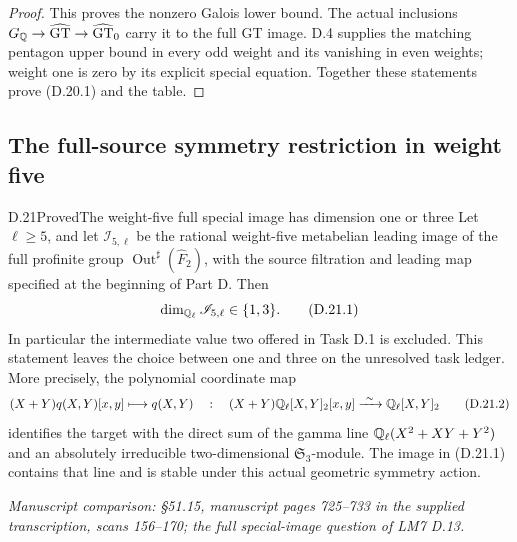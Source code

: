 \begin{proof}
This proves the nonzero Galois lower bound. The actual
inclusions $G_\mathbb Q\to\widehat{\rm GT}\to
\widehat{\rm GT}_0$ carry it to the full GT image.
D.4 supplies the matching pentagon upper bound in
every odd weight and its vanishing in even weights;
weight one is zero by its explicit special equation.
Together these statements prove (D.20.1) and the table.
\end{proof}
\subsection{The full-source symmetry restriction in weight five}

\begin{statement}{D.21}{Proved}{The weight-five full special image has dimension one or three}
Let $\ell\ge5$, and let $\mathscr I_{5,\ell}$ be the rational
weight-five metabelian leading image of the full profinite group
$\operatorname{Out}^{\sharp}(\widehat F_2)$, with the source
filtration and leading map specified at the beginning of Part D.
Then
\[
             \dim_{\mathbb Q_\ell}\mathscr I_{5,\ell}\in\{1,3\}.
             \tag{D.21.1}
\]
In particular the intermediate value two offered in Task D.1 is
excluded. This statement leaves the choice between one and three
on the unresolved task ledger.
More precisely, the polynomial coordinate map
\[
 (X+Y)q(X,Y)[x,y]\longmapsto q(X,Y)
 \quad:\quad
 (X+Y)\mathbb Q_\ell[X,Y]_2[x,y]\xrightarrow{\ \sim\ }
                    \mathbb Q_\ell[X,Y]_2
 \tag{D.21.2}
\]
identifies the target with the direct sum of the gamma line
$\mathbb Q_\ell(X^2+XY+Y^2)$ and an absolutely irreducible
two-dimensional $\mathfrak S_3$-module. The image in
(D.21.1) contains that line and is stable under this actual
geometric symmetry action.
\par\smallskip\noindent\emph{Manuscript comparison: \S51.15,
manuscript pages 725--733 in the supplied transcription,
scans 156--170; the full special-image question of LM7 D.13.}
\end{statement}
